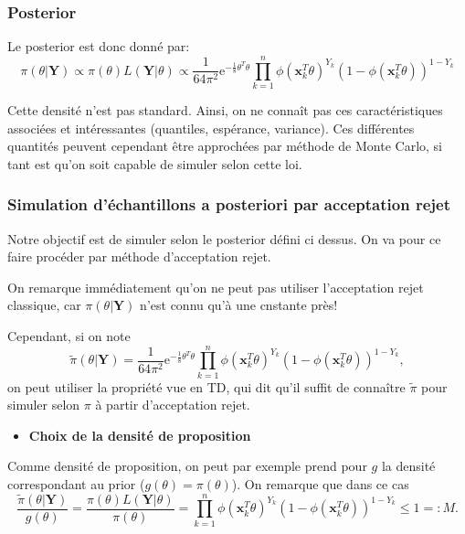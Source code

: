 \documentclass[]{article}
\providecommand{\tightlist}{%
  \setlength{\itemsep}{0pt}\setlength{\parskip}{0pt}}
\begin{document}
\hypertarget{posterior}{%
\subsubsection{Posterior}\label{posterior}}

Le posterior est donc donné par:
\[\pi(\theta \vert \mathbf{Y}) \propto \pi(\theta) L(\mathbf{Y}\vert \theta) \propto \frac{1}{64\pi^2}\text{e}^{-\frac{1}{8}\theta^T\theta} \prod_{k = 1}^n \phi(\mathbf{x}_k^T\theta)^{Y_k} (1 - \phi(\mathbf{x}_k^T\theta))^{1 - Y_k}\]

Cette densité n'est pas standard. Ainsi, on ne connaît pas ces
caractéristiques associées et intéressantes (quantiles, espérance,
variance). Ces différentes quantités peuvent cependant être approchées
par méthode de Monte Carlo, si tant est qu'on soit capable de simuler
selon cette loi.

\hypertarget{simulation-duxe9chantillons-a-posteriori-par-acceptation-rejet}{%
\subsubsection{Simulation d'échantillons a posteriori par acceptation
rejet}\label{simulation-duxe9chantillons-a-posteriori-par-acceptation-rejet}}

Notre objectif est de simuler selon le posterior défini ci dessus. On va
pour ce faire procéder par méthode d'acceptation rejet.

On remarque immédiatement qu'on ne peut pas utiliser l'acceptation rejet
classique, car \(\pi(\theta \vert \mathbf{Y})\) n'est connu qu'à une
cnstante près!

Cependant, si on note
\[\tilde{\pi}(\theta \vert \mathbf{Y}) = \frac{1}{64\pi^2}\text{e}^{-\frac{1}{8}\theta^T\theta} \prod_{k = 1}^n \phi(\mathbf{x}_k^T\theta)^{Y_k} (1 - \phi(\mathbf{x}_k^T\theta))^{1 - Y_k},\]
on peut utiliser la propriété vue en TD, qui dit qu'il suffit de
connaître \(\tilde{\pi}\) pour simuler selon \(\pi\) à partir
d'acceptation rejet.

\begin{itemize}
\tightlist
\item
  \textbf{Choix de la densité de proposition}
\end{itemize}

Comme densité de proposition, on peut par exemple prend pour \(g\) la
densité correspondant au prior (\(g(\theta) = \pi(\theta)\)). On
remarque que dans ce cas
\[\frac{\tilde{\pi}(\theta \vert \mathbf{Y})}{g(\theta)} = \frac{\pi(\theta)L(\mathbf{Y}\vert \theta)}{\pi(\theta)} = \prod_{k = 1}^n \phi(\mathbf{x}_k^T\theta)^{Y_k} (1 - \phi(\mathbf{x}_k^T\theta))^{1 - Y_k} \leq 1 =:M.\]
\end{document}
